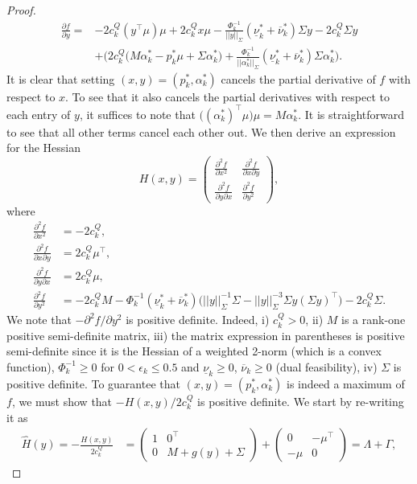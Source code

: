 \documentclass{article}
\begin{document}
\begin{proof}
\begin{align*}
\frac{\partial f}{\partial y} =& - 2c_k^Q (y^\top \mu) \mu + 2 c_k^Q x \mu - \frac{\Phi_k^{-1}}{||y||_\Sigma} (\underline{\nu}_k^* + \overline{\nu}_k^*) \Sigma y - 2c_k^Q \Sigma y\\
&+ \Big(2c_k^Q\big(M \alpha_k^* - p_k^* \mu + \Sigma \alpha_k^*\big) + \frac{\Phi_k^{-1}}{||\alpha_k^*||_\Sigma}(\underline{\nu}_k^* +\overline{\nu}_k^*) \Sigma \alpha_k^*\Big).
\end{align*}
It is clear that setting $(x, y) = (p_k^*, \alpha_k^*)$ cancels the partial derivative of $f$ with respect to $x$. To see that it also cancels the partial derivatives with respect to each entry of $y$, it suffices to note that $\big((\alpha_k^*)^\top \mu\big)\mu = M\alpha_k^*$. It is straightforward to see that all other terms cancel each other out. We then derive an expression for the Hessian
\begin{equation*}
H(x, y) = \begin{pmatrix} \frac{\partial^2 f}{\partial x^2} & \frac{\partial^2 f}{\partial x \partial y} \\ \frac{\partial^2 f}{\partial y \partial x} & \frac{\partial^2 f}{\partial y^2}\end{pmatrix},
\end{equation*}
where
\begin{align*}
\frac{\partial^2 f}{\partial x^2} &= - 2c_k^Q,\\
\frac{\partial^2 f}{\partial x \partial y} &= 2 c_k^Q \mu^\top,\\
\frac{\partial^2 f}{\partial y \partial x} &= 2 c_k^Q \mu,\\
\frac{\partial^2 f}{\partial y^2} &= -2 c_k^Q M - \Phi_k^{-1}(\underline{\nu}_k^* + \overline{\nu}_k^*)\Big(||y||_\Sigma^{-1} \Sigma - ||y||_\Sigma^{-3} \Sigma y(\Sigma y)^\top\Big) - 2c_k^Q \Sigma.
\end{align*}
We note that $-\partial^2 f/\partial y^2$ is positive definite. Indeed, i) $c_k^Q > 0$, ii) $M$ is a rank-one positive semi-definite matrix, iii) the matrix expression in parentheses is positive semi-definite since it is the Hessian of a weighted 2-norm (which is a convex function), $\Phi_k^{-1} \ge 0$ for $0 < \epsilon_k \le 0.5$ and $\underline{\nu}_k \ge 0$, $\overline{\nu}_k \ge 0$ (dual feasibility), iv) $\Sigma$ is positive definite. To guarantee that $(x, y) = (p_k^*, \alpha_k^*)$ is indeed a maximum of $f$, we must show that $-H(x, y)/2c_k^Q$ is positive definite. We start by re-writing it as
\begin{align*}
\hat{H}(y) = -\frac{H(x, y)}{2c_k^Q} &= \begin{pmatrix} 1 & 0^\top \\ 0 & M + g(y) + \Sigma\end{pmatrix} + \begin{pmatrix} 0 & -\mu^\top \\ -\mu & 0\end{pmatrix} = \Lambda + \Gamma,

\end{align*}
\end{proof}
\end{document}
